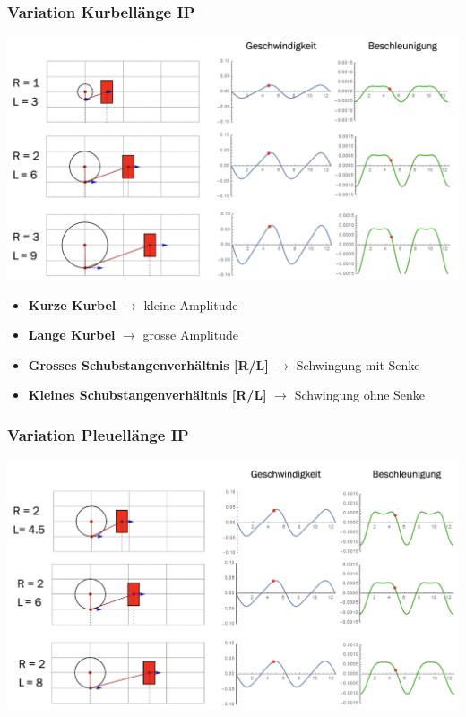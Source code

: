 \subsubsection{Variation Kurbellänge \hfill IP}
\begin{footnotesize}
    \begin{center}
        \includegraphics[width = 0.8\linewidth]{src/images/MAEIP_VariationKurbellaenge}
    \end{center}
    \begin{itemize}
        \item \textbf{Kurze Kurbel} $\to$ kleine Amplitude 
        \item \textbf{Lange Kurbel} $\to$ grosse Amplitude
        \item \textbf{Grosses Schubstangenverhältnis [R/L]} $\to$ Schwingung mit Senke
        \item \textbf{Kleines Schubstangenverhältnis [R/L]} $\to$ Schwingung ohne Senke
    \end{itemize}
\end{footnotesize}

\subsubsection{Variation Pleuellänge \hfill IP}
\begin{footnotesize}
    \begin{center}
        \includegraphics[width = 0.8\linewidth]{src/images/MAEIP_VariationPleuellaenge}
    \end{center}
\end{footnotesize}

